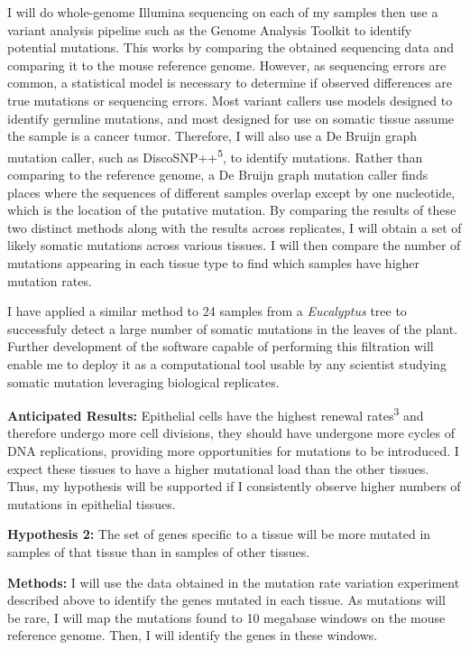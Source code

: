 \documentclass[12pt]{article}
\begin{document}
I will do whole-genome Illumina sequencing on each of my samples then use a variant analysis pipeline such as the Genome Analysis Toolkit to identify potential mutations.
This works by comparing the obtained sequencing data and comparing it to the mouse reference genome.
However, as sequencing errors are common, a statistical model is necessary to determine if observed differences are true mutations or sequencing errors.
Most variant callers use models designed to identify germline mutations, and most designed for use on somatic tissue assume the sample is a cancer tumor.
Therefore, I will also use a De Bruijn graph mutation caller, such as DiscoSNP++\textsuperscript{5}, to identify mutations.
Rather than comparing to the reference genome, a De Bruijn graph mutation caller finds places where the sequences of different samples overlap except by one nucleotide, which is the location of the putative mutation.
By comparing the results of these two distinct methods along with the results across replicates, I will obtain a set of likely somatic mutations across various tissues.
I will then compare the number of mutations appearing in each tissue type to find which samples have higher mutation rates.

I have applied a similar method to 24 samples from a \textit{Eucalyptus} tree to successfuly detect a large number of somatic mutations in the leaves of the plant. Further development of the software capable of performing this filtration will enable me to deploy it as a computational tool usable by any scientist studying somatic mutation leveraging biological replicates.

\textbf{Anticipated Results:}
Epithelial cells have the highest renewal rates\textsuperscript{3} and therefore undergo more cell divisions, they should have undergone more cycles of DNA replications, providing more opportunities for mutations to be introduced.
I expect these tissues to have a higher mutational load than the other tissues.
Thus, my hypothesis will be supported if I consistently observe higher numbers of mutations in epithelial tissues.

\textbf{Hypothesis 2:}
The set of genes specific to a tissue will be more mutated in samples of that tissue than in samples of other tissues.

\textbf{Methods:}
I will use the data obtained in the mutation rate variation experiment described above to identify the genes mutated in each tissue. As mutations will be rare, I will map the mutations found to 10 megabase windows on the mouse reference genome. Then, I will identify the genes in these windows.
\end{document}
